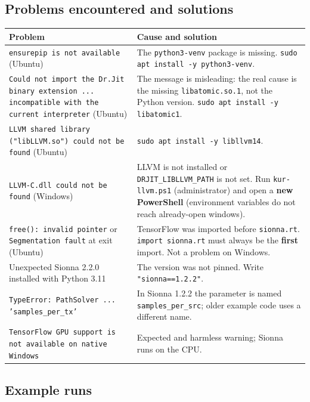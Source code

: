 \documentclass[10.5pt,a4paper]{article}
\begin{document}
\subsection{Problems encountered and solutions}
\begingroup\sffamily\small
\begin{xltabular}{\textwidth}{@{}p{4.4cm}X@{}}
\toprule
\textbf{Problem} & \textbf{Cause and solution} \\
\midrule
\texttt{ensurepip is not available} (Ubuntu) & The \texttt{python3-venv} package is missing. \texttt{sudo apt install -y python3-venv}. \\
\texttt{Could not import the Dr.Jit binary extension ... incompatible with the current interpreter} (Ubuntu) & The message is misleading: the real cause is the missing \texttt{libatomic.so.1}, not the Python version. \texttt{sudo apt install -y libatomic1}. \\
\texttt{LLVM shared library ("libLLVM.so") could not be found} (Ubuntu) & \texttt{sudo apt install -y libllvm14}. \\
\texttt{LLVM-C.dll could not be found} (Windows) & LLVM is not installed or \texttt{DRJIT\_LIBLLVM\_PATH} is not set. Run \texttt{kur-llvm.ps1} (administrator) and open a \textbf{new PowerShell} (environment variables do not reach already-open windows). \\
\texttt{free(): invalid pointer} or \texttt{Segmentation fault} at exit (Ubuntu) & TensorFlow was imported before \texttt{sionna.rt}. \texttt{import sionna.rt} must always be the \textbf{first} import. Not a problem on Windows. \\
Unexpected Sionna 2.2.0 installed with Python 3.11 & The version was not pinned. Write \texttt{"sionna==1.2.2"}. \\
\texttt{TypeError: PathSolver ... 'samples\_per\_tx'} & In Sionna 1.2.2 the parameter is named \texttt{samples\_per\_src}; older example code uses a different name. \\
\texttt{TensorFlow GPU support is not available on native Windows} & Expected and harmless warning; Sionna runs on the CPU. \\
\bottomrule
\end{xltabular}
\endgroup

\subsection{Example runs}
\end{document}
